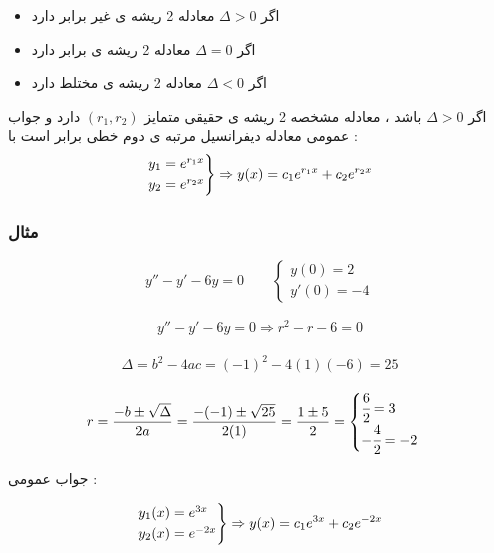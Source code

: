 \documentclass[12pt]{book}
\begin{document}
\begin{tcolorbox}
\begin{itemize}
	\item اگر 
	$\Delta > 0$
	معادله 2 ریشه ی غیر برابر دارد
	\item اگر 
	$\Delta = 0$
	معادله 2 ریشه ی برابر دارد
	\item اگر 
	$\Delta < 0$
	معادله 2 ریشه ی مختلط دارد
\end{itemize}
\end{tcolorbox}


\begin{tcolorbox}
اگر 
	$\Delta > 0$
	باشد ، معادله مشخصه 2 ریشه ی حقیقی متمایز 
	$(r_{1} , r_{2})$
	دارد و جواب عمومی معادله دیفرانسیل مرتبه ی دوم خطی برابر است با :
\begin{align*}
\begin{rcases*}
y_{1} = e^{r_{1}x} \\
y_{2} = e^{r_{2}x}
\end{rcases*}
\Rightarrow y(x) = c_{1}e^{r_{1}x} + c_{2}e^{r_{2}x}
\end{align*}
\end{tcolorbox}


\subsubsection{مثال}

$$
y'' - y' - 6y = 0 \qquad \begin{cases} y(0) = 2 \\ y'(0) = -4 \end{cases}
$$

\begin{align*}
y'' - y' - 6y = 0 \Rightarrow r^{2} - r - 6 = 0
\end{align*}

\begin{align*}
\Delta = b^{2} - 4ac = (-1)^{2} - 4 (1)(-6) = 25
\end{align*}

\begin{align*}
r = \frac{-b \pm \sqrt{\Delta}}{2a} = \frac{-(-1) \pm \sqrt{25}}{2(1)} = \frac{1 \pm 5}{2} = \begin{cases} \cfrac{6}{2} = 3 \\ -\cfrac{4}{2} = -2 \end{cases}
\end{align*}

جواب عمومی :

\begin{align*}
\begin{rcases}
y_{1}(x) = e^{3x} \\
y_{2}(x) = e^{-2x}
\end{rcases}
\Rightarrow y(x) = c_{1}e^{3x} + c_{2}e^{-2x} 
\end{align*}
\end{document}
